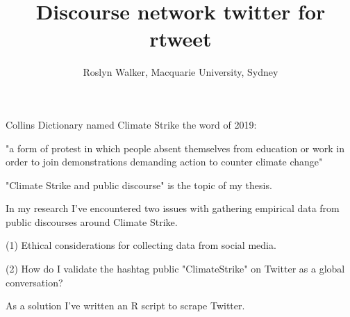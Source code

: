 \documentclass[unknownkeysallowed,usepdftitle=false, parskip=full]{beamer}
\title{Discourse network twitter for rtweet}
\author{Roslyn Walker, Macquarie University, Sydney\inst{}  \and \inst{} \and\inst{}}
\institute{\inst{}
\quad \inst{}}
\newcommand{\secvariable}{nothing}
\newcommand{\mysection}[1]{\renewcommand{\secvariable}{#1}
}
\begin{document}
\mysection{abstract}
\begin{frame}\label{\secvariable}



\parbox{\linewidth}{

Collins Dictionary named Climate Strike the word of 2019:


\vspace{12pt}

"a form of protest in which people absent themselves from education or work in order to join demonstrations demanding action to counter climate change"

 \vspace{12pt}
 
"Climate Strike and public discourse" is the topic of my thesis.

 \vspace{12pt}
 
 In my research I've encountered two issues with gathering empirical data from public discourses around Climate Strike.

\vspace{12pt}
(1) Ethical considerations for collecting data from social media.

\vspace{12pt}
(2) How do I validate the hashtag public "ClimateStrike" on Twitter as a global conversation?

\vspace{12pt}
As a solution I've written an R script to scrape Twitter.





 \vspace{12pt}
 
}


   
\end{frame}
\end{document}
